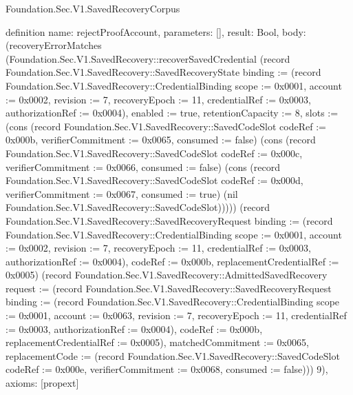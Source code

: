 \begin{lexlean}{Foundation.Sec.V1.SavedRecoveryCorpus}
\begin{semanticmodule}
definition{
  name: rejectProofAccount,
  parameters: [],
  result: Bool,
  body: (recoveryErrorMatches (Foundation.Sec.V1.SavedRecovery::recoverSavedCredential (record Foundation.Sec.V1.SavedRecovery::SavedRecoveryState {binding := (record Foundation.Sec.V1.SavedRecovery::CredentialBinding {scope := 0x0001, account := 0x0002, revision := 7, recoveryEpoch := 11, credentialRef := 0x0003, authorizationRef := 0x0004}), enabled := true, retentionCapacity := 8, slots := (cons (record Foundation.Sec.V1.SavedRecovery::SavedCodeSlot {codeRef := 0x000b, verifierCommitment := 0x0065, consumed := false}) (cons (record Foundation.Sec.V1.SavedRecovery::SavedCodeSlot {codeRef := 0x000c, verifierCommitment := 0x0066, consumed := false}) (cons (record Foundation.Sec.V1.SavedRecovery::SavedCodeSlot {codeRef := 0x000d, verifierCommitment := 0x0067, consumed := true}) (nil Foundation.Sec.V1.SavedRecovery::SavedCodeSlot))))}) (record Foundation.Sec.V1.SavedRecovery::SavedRecoveryRequest {binding := (record Foundation.Sec.V1.SavedRecovery::CredentialBinding {scope := 0x0001, account := 0x0002, revision := 7, recoveryEpoch := 11, credentialRef := 0x0003, authorizationRef := 0x0004}), codeRef := 0x000b, replacementCredentialRef := 0x0005}) (record Foundation.Sec.V1.SavedRecovery::AdmittedSavedRecovery {request := (record Foundation.Sec.V1.SavedRecovery::SavedRecoveryRequest {binding := (record Foundation.Sec.V1.SavedRecovery::CredentialBinding {scope := 0x0001, account := 0x0063, revision := 7, recoveryEpoch := 11, credentialRef := 0x0003, authorizationRef := 0x0004}), codeRef := 0x000b, replacementCredentialRef := 0x0005}), matchedCommitment := 0x0065, replacementCode := (record Foundation.Sec.V1.SavedRecovery::SavedCodeSlot {codeRef := 0x000e, verifierCommitment := 0x0068, consumed := false})})) 9),
  axioms: [propext]
}


\end{semanticmodule}
\end{lexlean}
